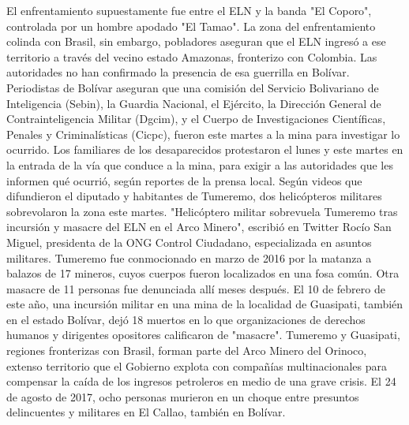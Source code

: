 \documentclass{article}%
\begin{document}
\newline%
%
El enfrentamiento supuestamente fue entre el ELN y la banda "El Coporo", controlada por un hombre apodado "El Tamao".%
\newline%
%
La zona del enfrentamiento colinda con Brasil, sin embargo, pobladores aseguran que el ELN ingresó a ese territorio a través del vecino estado Amazonas, fronterizo con Colombia. Las autoridades no han confirmado la presencia de esa guerrilla en Bolívar.%
\newline%
%
Periodistas de Bolívar aseguran que una comisión del Servicio Bolivariano de Inteligencia (Sebin), la Guardia Nacional, el Ejército, la Dirección General de Contrainteligencia Militar (Dgcim), y el Cuerpo de Investigaciones Científicas, Penales y Criminalísticas (Cicpc), fueron este martes a la mina para investigar lo ocurrido.%
\newline%
%
Los familiares de los desaparecidos protestaron el lunes y este martes en la entrada de la vía que conduce a la mina, para exigir a las autoridades que les informen qué ocurrió, según reportes de la prensa local.%
\newline%
%
Según videos que difundieron el diputado y habitantes de Tumeremo, dos helicópteros militares sobrevolaron la zona este martes.%
\newline%
%
"Helicóptero militar sobrevuela Tumeremo tras incursión y masacre del ELN en el Arco Minero", escribió en Twitter Rocío San Miguel, presidenta de la ONG Control Ciudadano, especializada en asuntos militares.%
\newline%
%
Tumeremo fue conmocionado en marzo de 2016 por la matanza a balazos de 17 mineros, cuyos cuerpos fueron localizados en una fosa común.%
\newline%
%
Otra masacre de 11 personas fue denunciada allí meses después.\newline%
\newline%
El 10 de febrero de este año, una incursión militar en una mina de la localidad de Guasipati, también en el estado Bolívar, dejó 18 muertos en lo que organizaciones de derechos humanos y dirigentes opositores calificaron de "masacre".%
\newline%
%
Tumeremo y Guasipati, regiones fronterizas con Brasil, forman parte del Arco Minero del Orinoco, extenso territorio que el Gobierno explota con compañías multinacionales para compensar la caída de los ingresos petroleros en medio de una grave crisis.%
\newline%
%
El 24 de agosto de 2017, ocho personas murieron en un choque entre presuntos delincuentes y militares en El Callao, también en Bolívar.%
\newline%
%
\end{document}
